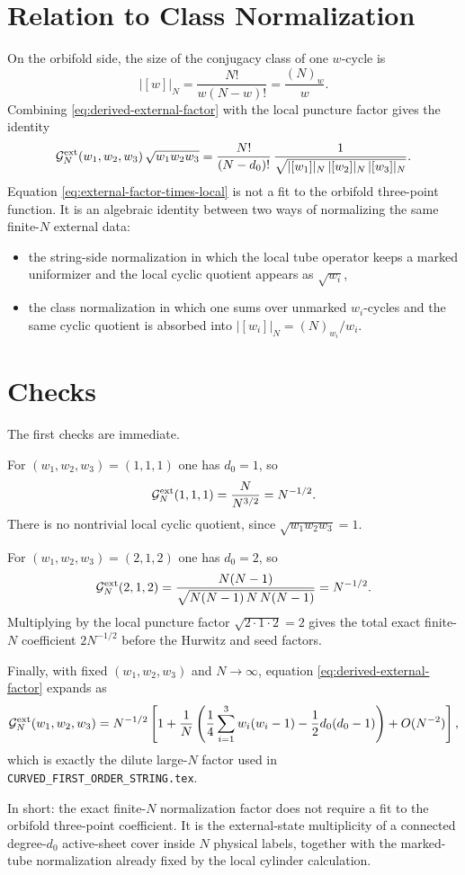 \documentclass[11pt]{article}
\newcommand{\mc}[1]{\mathcal{#1}}
\begin{document}
\section{Relation to Class Normalization}
On the orbifold side, the size of the conjugacy class of one $w$-cycle is
\begin{equation}\label{eq:class-size}
|[w]|_N
=
\frac{N!}{w(N-w)!}
=
\frac{(N)_w}{w}.
\end{equation}
Combining \eqref{eq:derived-external-factor} with the local puncture factor gives the identity
\begin{equation}\label{eq:external-factor-times-local}
\mc G_N^{\rm ext}(w_1,w_2,w_3)\,
\sqrt{w_1w_2w_3}
=
\frac{N!}{(N-d_0)!}\,
\frac{1}{\sqrt{|[w_1]|_N\,|[w_2]|_N\,|[w_3]|_N}}.
\end{equation}
Equation \eqref{eq:external-factor-times-local} is not a fit to the orbifold three-point function. It is an algebraic identity between two ways of normalizing the same finite-$N$ external data:
\begin{itemize}
\item the string-side normalization in which the local tube operator keeps a marked uniformizer and the local cyclic quotient appears as $\sqrt{w_i}$,
\item the class normalization in which one sums over unmarked $w_i$-cycles and the same cyclic quotient is absorbed into $|[w_i]|_N=(N)_{w_i}/w_i$.
\end{itemize}

\section{Checks}
The first checks are immediate.

For $(w_1,w_2,w_3)=(1,1,1)$ one has $d_0=1$, so
\[
\mc G_N^{\rm ext}(1,1,1)=\frac{N}{N^{3/2}}=N^{-1/2}.
\]
There is no nontrivial local cyclic quotient, since $\sqrt{w_1w_2w_3}=1$.

For $(w_1,w_2,w_3)=(2,1,2)$ one has $d_0=2$, so
\[
\mc G_N^{\rm ext}(2,1,2)
=
\frac{N(N-1)}{\sqrt{N(N-1)\,N\,N(N-1)}}
=
N^{-1/2}.
\]
Multiplying by the local puncture factor $\sqrt{2\cdot1\cdot2}=2$ gives the total exact finite-$N$ coefficient $2N^{-1/2}$ before the Hurwitz and seed factors.

Finally, with fixed $(w_1,w_2,w_3)$ and $N\to\infty$, equation \eqref{eq:derived-external-factor} expands as
\begin{equation}\label{eq:large-n-expansion}
\mc G_N^{\rm ext}(w_1,w_2,w_3)
=
N^{-1/2}
\left[
1+\frac{1}{N}
\left(
\frac14\sum_{i=1}^3 w_i(w_i-1)-\frac12 d_0(d_0-1)
\right)
+O(N^{-2})
\right],
\end{equation}
which is exactly the dilute large-$N$ factor used in \texttt{CURVED\_FIRST\_ORDER\_STRING.tex}.

In short: the exact finite-$N$ normalization factor does not require a fit to the orbifold three-point coefficient. It is the external-state multiplicity of a connected degree-$d_0$ active-sheet cover inside $N$ physical labels, together with the marked-tube normalization already fixed by the local cylinder calculation.
\end{document}
